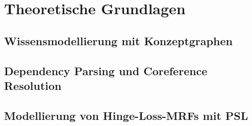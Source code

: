 %
\chapter{Theoretische Grundlagen}
\label{sec:theory}

\section{Wissensmodellierung mit Konzeptgraphen}
\label{sec:theory:concept-graphs}

\section{Dependency Parsing und Coreference Resolution}
\label{sec:theory:dep-parsing-coref-res}

\section{Modellierung von Hinge-Loss-MRFs mit PSL}
\label{sec:hlmrf-psl}
